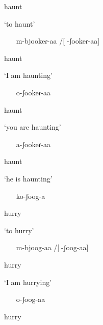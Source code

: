 haunt

\textsc{‘}to haunt’

\begin{itemize}
\item [m-bjookeɾ-aa]/[-ʃookeɾ-aa]

\end{itemize}

haunt

\textsc{‘}I am haunting’

\begin{itemize}
\item [o-ʃookeɾ-aa]

\end{itemize}

haunt

\textsc{‘}you are haunting’

\begin{itemize}
\item [a-ʃookeɾ-aa]

\end{itemize}

haunt

\textsc{‘}he is haunting’

\begin{itemize}
\item [ko-ʃoog-a]

\end{itemize}

hurry

\textsc{‘}to hurry’

\begin{itemize}
\item [m-bjoog-aa]/[-ʃoog-aa]

\end{itemize}

hurry

\textsc{‘}I am hurrying’

\begin{itemize}
\item [o-ʃoog-aa]

\end{itemize}

hurry

